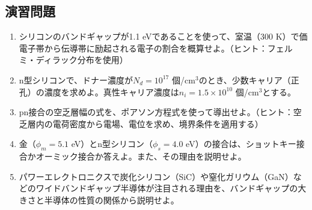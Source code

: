 \subsection{演習問題}

\begin{enumerate}
\item シリコンのバンドギャップが1.1 eVであることを使って、室温（300 K）で価電子帯から伝導帯に励起される電子の割合を概算せよ。（ヒント：フェルミ・ディラック分布を使用）

\item n型シリコンで、ドナー濃度が$N_d = 10^{17}$ 個/cm$^3$のとき、少数キャリア（正孔）の濃度を求めよ。真性キャリア濃度は$n_i = 1.5 \times 10^{10}$ 個/cm$^3$とする。

\item pn接合の空乏層幅の式を、ポアソン方程式を使って導出せよ。（ヒント：空乏層内の電荷密度から電場、電位を求め、境界条件を適用する）

\item 金（$\phi_m = 5.1$ eV）とn型シリコン（$\phi_s = 4.0$ eV）の接合は、ショットキー接合かオーミック接合か答えよ。また、その理由を説明せよ。

\item パワーエレクトロニクスで炭化シリコン（SiC）や窒化ガリウム（GaN）などのワイドバンドギャップ半導体が注目される理由を、バンドギャップの大きさと半導体の性質の関係から説明せよ。
\end{enumerate}
